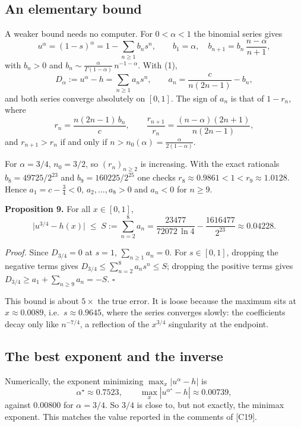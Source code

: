 \documentclass[
  11pt,
]{article}
\begin{document}
\hypertarget{an-elementary-bound}{%
\subsection{An elementary bound}\label{an-elementary-bound}}

A weaker bound needs no computer. For \(0 < \alpha < 1\) the binomial
series gives \[
u^\alpha = (1-s)^\alpha = 1 - \sum_{n\ge1} b_n s^n, \qquad b_1 = \alpha,\quad b_{n+1} = b_n\,\frac{n-\alpha}{n+1},
\] with \(b_n > 0\) and
\(b_n \sim \frac{\alpha}{\Gamma(1-\alpha)}\, n^{-1-\alpha}\). With (1),
\[
D_\alpha := u^\alpha - h = \sum_{n\ge1} a_n s^n, \qquad a_n = \frac{c}{n(2n-1)} - b_n , \tag{3}
\] and both series converge absolutely on \([0,1]\). The sign of \(a_n\)
is that of \(1 - r_n\), where \[
r_n = \frac{n(2n-1)\,b_n}{c}, \qquad \frac{r_{n+1}}{r_n} = \frac{(n-\alpha)(2n+1)}{n(2n-1)}, \tag{4}
\] and \(r_{n+1} > r_n\) if and only if
\(n > n_0(\alpha) = \frac{\alpha}{2(1-\alpha)}\).

For \(\alpha = 3/4\), \(n_0 = 3/2\), so \((r_n)_{n\ge2}\) is increasing.
With the exact rationals \(b_8 = 49725/2^{23}\) and
\(b_9 = 160225/2^{25}\) one checks
\(r_8 \approx 0.9861 < 1 < r_9 \approx 1.0128\). Hence
\(a_1 = c - \tfrac34 < 0\), \(a_2, \dots, a_8 > 0\) and \(a_n < 0\) for
\(n \ge 9\).

\textbf{Proposition 9.} For all \(x \in [0,1]\), \[
\bigl| u^{3/4} - h(x) \bigr| \;\le\; S := \sum_{n=2}^{8} a_n = \frac{23477}{72072\,\ln 4} - \frac{1616477}{2^{23}} \approx 0.04228 .
\]

\emph{Proof.} Since \(D_{3/4} = 0\) at \(s = 1\),
\(\sum_{n\ge1} a_n = 0\). For \(s \in [0,1]\), dropping the negative
terms gives \(D_{3/4} \le \sum_{n=2}^8 a_n s^n \le S\); dropping the
positive terms gives \(D_{3/4} \ge a_1 + \sum_{n\ge9} a_n = -S\).
\(\square\)

This bound is about \(5\times\) the true error. It is loose because the
maximum sits at \(x \approx 0.0089\), i.e.~\(s \approx 0.9645\), where
the series converges slowly: the coefficients decay only like
\(n^{-7/4}\), a reflection of the \(x^{3/4}\) singularity at the
endpoint.

\hypertarget{the-best-exponent-and-the-inverse}{%
\subsection{The best exponent and the
inverse}\label{the-best-exponent-and-the-inverse}}

Numerically, the exponent minimizing \(\max_x |u^\alpha - h|\) is \[
\alpha^\star \approx 0.7523, \qquad \max_x |u^{\alpha^\star} - h| \approx 0.00739,
\] against \(0.00800\) for \(\alpha = 3/4\). So \(3/4\) is close to, but
not exactly, the minimax exponent. This matches the value reported in
the comments of {[}C19{]}.
\end{document}
